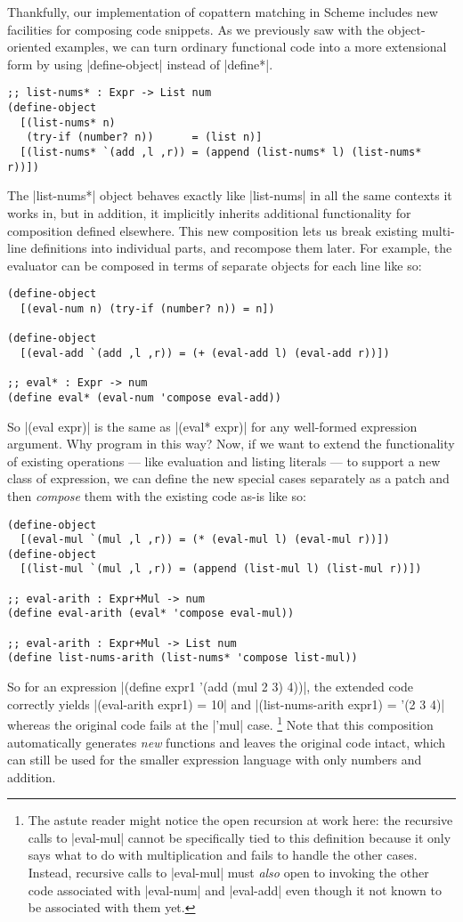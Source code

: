Thankfully, our implementation of copattern matching in Scheme includes new facilities for composing code snippets.
As we previously saw with the object-oriented examples, we can turn ordinary functional code into a more extensional form by using \scm|define-object| instead of \scm|define*|.
\begin{verbatim}
;; list-nums* : Expr -> List num
(define-object
  [(list-nums* n)
   (try-if (number? n))      = (list n)]
  [(list-nums* `(add ,l ,r)) = (append (list-nums* l) (list-nums* r))])
\end{verbatim}
The \scm|list-nums*| object behaves exactly like \scm|list-nums| in all the same contexts it works in, but in addition, it implicitly inherits additional functionality for composition defined elsewhere.
This new composition lets us break existing multi-line definitions into individual parts, and recompose them later.
For example, the evaluator can be composed in terms of separate objects for each line like so:
\begin{verbatim}
(define-object
  [(eval-num n) (try-if (number? n)) = n])

(define-object
  [(eval-add `(add ,l ,r)) = (+ (eval-add l) (eval-add r))])

;; eval* : Expr -> num
(define eval* (eval-num 'compose eval-add))
\end{verbatim}
So \scm|(eval expr)| is the same as \scm|(eval* expr)| for any well-formed expression argument.
Why program in this way?
Now, if we want to extend the functionality of existing operations --- like evaluation and listing literals --- to support a new class of expression, we can define the new special cases separately as a patch and then \emph{compose} them with the existing code as-is like so:
\begin{verbatim}
(define-object
  [(eval-mul `(mul ,l ,r)) = (* (eval-mul l) (eval-mul r))])
(define-object
  [(list-mul `(mul ,l ,r)) = (append (list-mul l) (list-mul r))])

;; eval-arith : Expr+Mul -> num
(define eval-arith (eval* 'compose eval-mul))

;; eval-arith : Expr+Mul -> List num
(define list-nums-arith (list-nums* 'compose list-mul))
\end{verbatim}
So for an expression \scm|(define expr1 '(add (mul 2 3) 4))|, the extended code correctly yields \scm|(eval-arith expr1) = 10| and \scm|(list-nums-arith expr1) = '(2 3 4)| whereas the original code fails at the \scm|'mul| case.%
\footnote{
  The astute reader might notice the open recursion at work here: the recursive calls to \scm|eval-mul| cannot be specifically tied to this definition because it only says what to do with multiplication and fails to handle the other cases.
  Instead, recursive calls to \scm|eval-mul| must \emph{also} open to invoking the other code associated with \scm|eval-num| and \scm|eval-add| even though it not known to be associated with them yet.}
%
Note that this composition automatically generates \emph{new} functions and leaves the original code intact, which can still be used for the smaller expression language with only numbers and addition.

